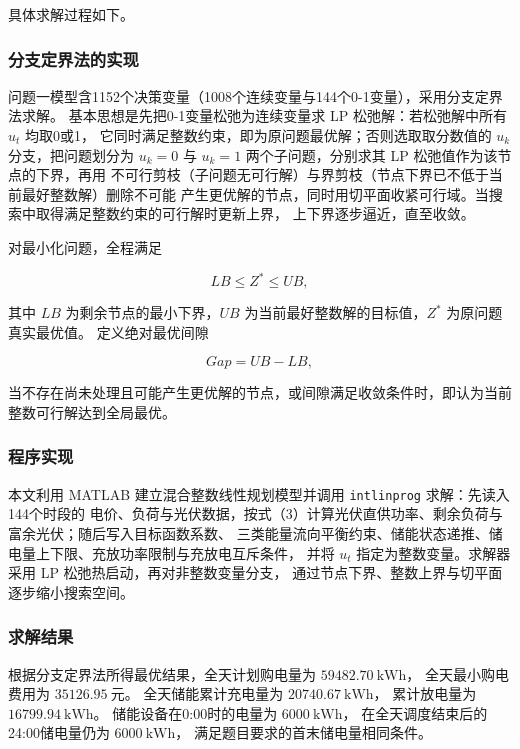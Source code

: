 具体求解过程如下。

\subsubsection{分支定界法的实现}

问题一模型含1152个决策变量（1008个连续变量与144个0-1变量），采用分支定界法求解。
基本思想是先把0-1变量松弛为连续变量求 LP 松弛解：若松弛解中所有 \(u_t\) 均取0或1，
它同时满足整数约束，即为原问题最优解；否则选取取分数值的 \(u_k\) 分支，把问题划分为
\(u_k=0\) 与 \(u_k=1\) 两个子问题，分别求其 LP 松弛值作为该节点的下界，再用
不可行剪枝（子问题无可行解）与界剪枝（节点下界已不低于当前最好整数解）删除不可能
产生更优解的节点，同时用切平面收紧可行域。当搜索中取得满足整数约束的可行解时更新上界，
上下界逐步逼近，直至收敛。

对最小化问题，全程满足

\[
LB\leq Z^*\leq UB,
\]

其中 \(LB\) 为剩余节点的最小下界，\(UB\) 为当前最好整数解的目标值，\(Z^*\) 为原问题真实最优值。
定义绝对最优间隙

\[
Gap=UB-LB,
\]

当不存在尚未处理且可能产生更优解的节点，或间隙满足收敛条件时，即认为当前整数可行解达到全局最优。

\subsubsection{程序实现}

本文利用 MATLAB 建立混合整数线性规划模型并调用 \texttt{intlinprog} 求解：先读入144个时段的
电价、负荷与光伏数据，按式（3）计算光伏直供功率、剩余负荷与富余光伏；随后写入目标函数系数、
三类能量流向平衡约束、储能状态递推、储电量上下限、充放功率限制与充放电互斥条件，
并将 \(u_t\) 指定为整数变量。求解器采用 LP 松弛热启动，再对非整数变量分支，
通过节点下界、整数上界与切平面逐步缩小搜索空间。

\subsubsection{求解结果}

根据分支定界法所得最优结果，全天计划购电量为 \(\boxed{59482.70\ \mathrm{kWh}}\)， 全天最小购电费用为 \(\boxed{35126.95\ \text{元}}\)。 全天储能累计充电量为 \(20740.67\ \mathrm{kWh}\)， 累计放电量为 \(16799.94\ \mathrm{kWh}\)。 储能设备在0:00时的电量为 \(6000\ \mathrm{kWh}\)， 在全天调度结束后的24:00储电量仍为 \(6000\ \mathrm{kWh}\)， 满足题目要求的首末储电量相同条件。

